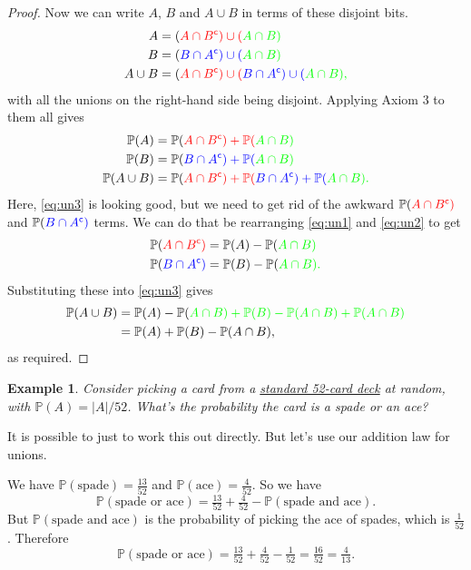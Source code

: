 \documentclass[
  a4paper,
]{book}
\theoremstyle{definition}
\theoremstyle{definition}
\newtheorem{example}{Example}[chapter]
\theoremstyle{definition}
\theoremstyle{definition}
\theoremstyle{remark}
\begin{document}
\begin{proof}
Now we can write \(A\), \(B\) and \(A \cup B\) in terms of these disjoint bits.
\begin{align}
A &= (\color{red}{A \cap B^\mathsf{c}}) \cup (\color{green}{A \cap B}) \\
B &= (\color{blue}{B \cap A^\mathsf{c}}) \cup (\color{green}{A \cap B}) \\
A \cup B &= (\color{red}{A \cap B^\mathsf{c}}) \cup (\color{blue}{B \cap A^\mathsf{c}}) \cup (\color{green}{A \cap B}),
\end{align}
with all the unions on the right-hand side being disjoint. Applying Axiom 3 to them all gives
\begin{align}
\mathbb P(A) &= \mathbb P(\color{red}{A \cap B^\mathsf{c}}) + \mathbb P(\color{green}{A \cap B}) \label{eq:un1}  \\
\mathbb P(B) &= \mathbb P(\color{blue}{B \cap A^\mathsf{c}}) + \mathbb P(\color{green}{A \cap B})  \label{eq:un2} \\
\mathbb P(A \cup B) &= \mathbb P(\color{red}{A \cap B^\mathsf{c}}) + \mathbb P(\color{blue}{B \cap A^\mathsf{c}}) + \mathbb P(\color{green}{A \cap B}) . \label{eq:un3}
\end{align}
Here, \eqref{eq:un3} is looking good, but we need to get rid of the awkward \(\mathbb P(\color{red}{A \cap B^\mathsf{c}})\) and \(\mathbb P(\color{blue}{B \cap A^\mathsf{c}})\) terms. We can do that be rearranging \eqref{eq:un1} and \eqref{eq:un2} to get
\begin{align}
\mathbb P(\color{red}{A \cap B^\mathsf{c}}) &= \mathbb P(A) - \mathbb P(\color{green}{A \cap B}) \\
\mathbb P(\color{blue}{B \cap A^\mathsf{c}}) &= \mathbb P(B) - \mathbb P(\color{green}{A \cap B}) .
\end{align}
Substituting these into \eqref{eq:un3} gives
\begin{align}
\mathbb P(A \cup B) &= \mathbb P(A) - \mathbb P(\color{green}{A \cap B}) + \mathbb P(B) - \mathbb P(\color{green}{A \cap B}) + \mathbb P(\color{green}{A \cap B}) \\
  &= \mathbb P(A)+ \mathbb P(B) - \mathbb P(A \cap B) ,
\end{align}
as required.
\end{proof}

\begin{example}
\emph{Consider picking a card from a \href{https://en.wikipedia.org/wiki/Standard_52-card_deck}{standard 52-card deck} at random, with \(\mathbb P(A) = |A|/52\). What's the probability the card is a spade or an ace?}

It is possible to just to work this out directly. But let's use our addition law for unions.

We have \(\mathbb P(\text{spade}) = \frac{13}{52}\) and \(\mathbb P(\text{ace}) = \frac{4}{52}\). So we have
\[ \mathbb P(\text{spade or ace}) = \tfrac{13}{52} + \tfrac{4}{52} - \mathbb P(\text{spade and ace}) . \]
But \(\mathbb P(\text{spade and ace})\) is the probability of picking the ace of spades, which is \(\frac{1}{52}\). Therefore
\[ \mathbb P(\text{spade or ace}) = \tfrac{13}{52} + \tfrac{4}{52}  - \tfrac{1}{52} = \tfrac{16}{52} = \tfrac{4}{13} . \]
\end{example}
\end{document}
